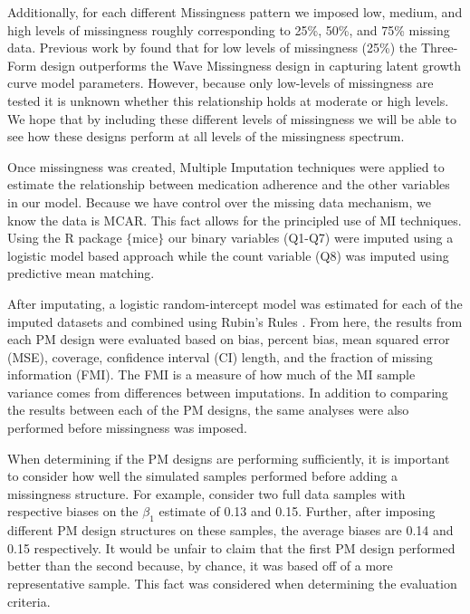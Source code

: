 \documentclass{svjour3}                     %
\begin{document}
Additionally, for each different Missingness pattern we imposed low, medium, and high levels of missingness roughly corresponding to 25\%, 50\%, and 75\% missing data. Previous work by \citet{rhemtulla2014planned} found that for low levels of missingness (25\%) the Three-Form design outperforms the Wave Missingness design in capturing latent growth curve model parameters. However, because only low-levels of missingness are tested it is unknown whether this relationship holds at moderate or high levels. We hope that by including these different levels of missingness we will be able to see how these designs perform at all levels of the missingness spectrum. \par
Once missingness was created, Multiple Imputation techniques were applied to estimate the relationship between medication adherence and the other variables in our model. Because we have control over the missing data mechanism, we know the data is MCAR. This fact allows for the principled use of MI techniques. Using the R package $\{$mice$\}$ \citep{mice2011imputation} our binary variables (Q1-Q7) were imputed using a logistic model based approach while the count variable (Q8) was imputed using predictive mean matching. \par

After imputating, a logistic random-intercept model was estimated for each of the imputed datasets and combined using Rubin's Rules \citep{rubin2004multiple}. From here, the results from each PM design were evaluated based on bias, percent bias, mean squared error (MSE), coverage, confidence interval (CI) length, and the fraction of missing information (FMI). The FMI is a measure of how much of the MI sample variance comes from differences between imputations. In addition to comparing the results between each of the PM designs, the same analyses were also performed before missingness was imposed. \par

When determining if the PM designs are performing sufficiently, it is important to consider how well the simulated samples performed before adding a missingness structure. For example, consider two full data samples with respective biases on the $\beta_1$ estimate of 0.13 and 0.15. Further, after imposing different PM design structures on these samples, the average biases are 0.14 and 0.15 respectively. It would be unfair to claim that the first PM design performed better than the second because, by chance, it was based off of a more representative sample. This fact was considered when determining the evaluation criteria. \par
\end{document}
